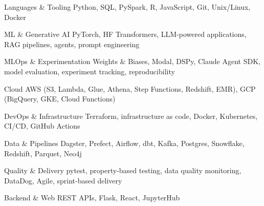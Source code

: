 
\begin{cvskills}

  \cvskill
    {Languages \& Tooling}
    {Python, SQL, PySpark, R, JavaScript, Git, Unix/Linux, Docker}

  \cvskill
    {ML \& Generative AI}
    {PyTorch, HF Transformers, LLM-powered applications, RAG pipelines, agents, prompt engineering}

  \cvskill
    {MLOps \& Experimentation}
    {Weights \& Biases, Modal, DSPy, Claude Agent SDK, model evaluation, experiment tracking, reproducibility}

  \cvskill
    {Cloud}
    {AWS (S3, Lambda, Glue, Athena, Step Functions, Redshift, EMR), GCP (BigQuery, GKE, Cloud Functions)}

  \cvskill
    {DevOps \& Infrastructure}
    {Terraform, infrastructure as code, Docker, Kubernetes, CI/CD, GitHub Actions}

  \cvskill
    {Data \& Pipelines}
    {Dagster, Prefect, Airflow, dbt, Kafka, Postgres, Snowflake, Redshift, Parquet, Neo4j}

  \cvskill
    {Quality \& Delivery}
    {pytest, property-based testing, data quality monitoring, DataDog, Agile, sprint-based delivery}

  \cvskill
    {Backend \& Web}
    {REST APIs, Flask, React, JupyterHub}

\end{cvskills}
